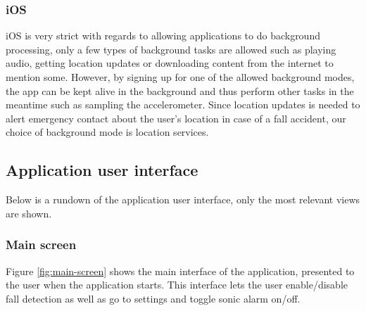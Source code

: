 \documentclass[12pt, a4paper, onecolumn]{article}
\begin{document}
	\subsubsection{iOS}
	iOS is very strict with regards to allowing applications to do background processing, only a few types of background tasks are allowed such as playing audio, getting location updates or downloading content from the internet to mention some. However, by signing up for one of the allowed background modes, the app can be kept alive in the background and thus perform other tasks in the meantime such as sampling the accelerometer. Since location updates is needed to alert emergency contact about the user's location in case of a fall accident, our choice of background mode is location services.
	
	\newpage
	\subsection{Application user interface}
	
	Below is a rundown of the application user interface, only the most relevant views are shown. 
	
	\subsubsection{Main screen}
	Figure \ref{fig:main-screen} shows the main interface of the application, presented to the user when the application starts. This interface lets the user enable/disable fall detection as well as go to settings and toggle sonic alarm on/off.
	
\end{document}
